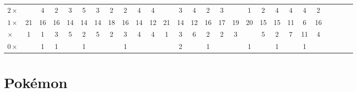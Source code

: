 \documentclass{article}
\newcommand{\immune}{{\color{blue} $0\times$}}
\newcommand{\notvery}{{\color{green} \sfrac{1}{2}$\times$}}
\newcommand{\normal}{{$1\times$}}
\newcommand{\super}{{\color{red} $2\times$}}
\begin{document}
\begin{landscape}
\begin{longtable}{l|cccc|ccccc|cccc|ccccc|cccc|cccc}
\super &
 & %
4 & %
2 & %
3 & %
5 & %
3 & %
2 & %
2 & %
4 & %
4 & %
 & %
3 & %
4 & %
2 & %
3 & %
 & %
1 & %
2 & %
4 & %
4 & %
4 & %
2 & %
 &  &  &  \\

\normal &
21 & %
16 & %
16 & %
14 & %
14 & %
14 & %
18 & %
16 & %
14 & %
12 & %
21 & %
14 & %
12 & %
16 & %
17 & %
19 & %
20 & %
15 & %
15 & %
11 & %
 6 & %
16 & %
 &  &  &  \\

\notvery &
1 & %
1 & %
3 & %
5 & %
2 & %
5 & %
2 & %
3 & %
4 & %
4 & %
1 & %
3 & %
6 & %
2 & %
2 & %
3 & %
 & %
5 & %
2 & %
7 & %
11 & %
4 & %
 &  &  &  \\

\immune &
 & %
1 & %
1 & %
 & %
1 & %
 & %
 & %
1 & %
 & %
 & %
 & %
2 & %
 & %
1 & %
 & %
 & %
1 & %
 & %
1 & %
 & %
1 & %
 & %
 &  &  &  \\
\end{longtable}

\end{landscape}

\clearpage
\normalsize
\section{Pok\'emon}
\end{document}
